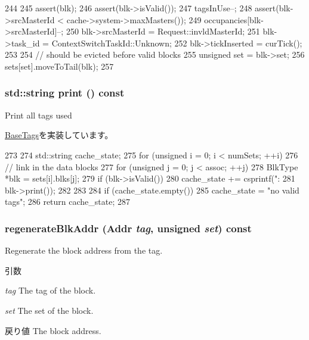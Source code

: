 \begin{DoxyCode}
244 {
245     assert(blk);
246     assert(blk->isValid());
247     tagsInUse--;
248     assert(blk->srcMasterId < cache->system->maxMasters());
249     occupancies[blk->srcMasterId]--;
250     blk->srcMasterId = Request::invldMasterId;
251     blk->task_id = ContextSwitchTaskId::Unknown;
252     blk->tickInserted = curTick();
253 
254     // should be evicted before valid blocks
255     unsigned set = blk->set;
256     sets[set].moveToTail(blk);
257 }
\end{DoxyCode}
\hypertarget{classLRU_ae8a5b5e9e0e6be3b115ee77fa7b4d0c8}{
\subsubsection[{print}]{\setlength{\rightskip}{0pt plus 5cm}std::string print () const}}
\label{classLRU_ae8a5b5e9e0e6be3b115ee77fa7b4d0c8}
Print all tags used 

\hyperlink{classBaseTags_a56a7c10391fb704ea26efc16f4f4f87b}{BaseTags}を実装しています。


\begin{DoxyCode}
273                  {
274     std::string cache_state;
275     for (unsigned i = 0; i < numSets; ++i) {
276         // link in the data blocks
277         for (unsigned j = 0; j < assoc; ++j) {
278             BlkType *blk = sets[i].blks[j];
279             if (blk->isValid())
280                 cache_state += csprintf("\tset: %
281                         blk->print());
282         }
283     }
284     if (cache_state.empty())
285         cache_state = "no valid tags\n";
286     return cache_state;
287 }
\end{DoxyCode}
\hypertarget{classLRU_a33c16949fb3c73efb61bca4c90195b7d}{
\subsubsection[{regenerateBlkAddr}]{ regenerateBlkAddr ({\bf Addr} {\em tag}, \/  unsigned {\em set}) const}}
\label{classLRU_a33c16949fb3c73efb61bca4c90195b7d}
Regenerate the block address from the tag. 
\begin{DoxyParams}{引数}
\item[{\em tag}]The tag of the block. \item[{\em set}]The set of the block. \end{DoxyParams}
\begin{DoxyReturn}{戻り値}
The block address. 
\end{DoxyReturn}



